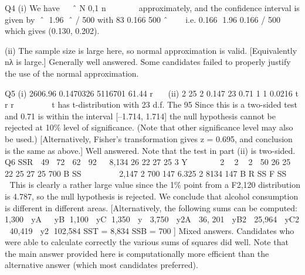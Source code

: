 \documentclass[a4paper,12pt]{article}
\begin{document}
  Q4 (i) We have  
ˆ
N 0,1
n
  

 
approximately, and the confidence interval is
given by
ˆ 1.96 ˆ / 500 with 83 0.166
500
ˆ   
i.e. 0.166 1.96 0.166 / 500 which gives (0.130, 0.202).

(ii) The sample size is large here, so normal approximation is valid. [Equivalently nλ is large.]
Generally well answered. Some candidates failed to properly justify the use of the normal approximation.

Q5 (i) 2606.96 0.1470326
5116701 61.44
r 

(ii)
2
25 2 0.147 23 0.71
1 1 0.0216
t r
r
 
  
 
t has t-distribution with 23 d.f. The 95%
Since this is a two-sided test and 0.71 is within the interval [–1.714, 1.714] the null hypothesis cannot be rejected at 10\% level of significance.
(Note that other significance level may also be used.)
[Alternatively, Fisher’s transformation gives z = 0.695, and conclusion is the   same as above.]
Well answered. Note that the test in part (ii) is two-sided.
Q6 SSR  49 72  62  92   8,134
26 22 27 25
3
Y  
 
 2  2  2  50 26 25 22 25 27 25 700 B SS       
2,147
2 700 147 6.325
2 8134
147
B
R
SS
F SS
  
This is clearly a rather large value since the 1\% point from a F2,120 distribution is
4.787, so the null hypothesis is rejected. We conclude that alcohol consumption is different in different areas.
[Alternatively, the following sums can be computed:
    1,300  yA   yB 1,100  yC 1,350  y  3,750
   y2A  36, 201  yB2  25,964  yC2  40,419  y2 102,584
  SST = 8,834 SSB = 700 ]
Mixed answers. Candidates who were able to calculate correctly the various
sums of squares did well. Note that the main answer provided here is
computationally more efficient than the alternative answer (which most
                                                            candidates preferred).
\end{document}
